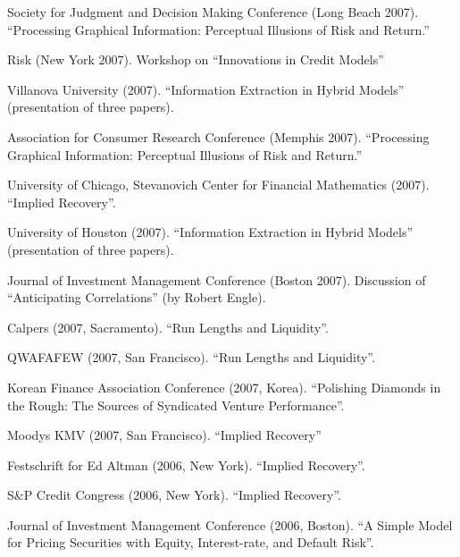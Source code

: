 \documentclass{article}
\begin{document}
\begin{etaremune}
{\item Society for Judgment and Decision Making Conference (Long Beach 2007). 
``Processing Graphical Information: Perceptual Illusions of Risk and Return.''

\item Risk (New York 2007). 
Workshop on ``Innovations in Credit Models''

\item Villanova University (2007). 
``Information Extraction in Hybrid Models'' (presentation of three papers). 

\item Association for Consumer Research Conference (Memphis 2007). 
``Processing Graphical Information: Perceptual Illusions of Risk and Return.''

\item University of Chicago, Stevanovich Center for Financial Mathematics (2007).
``Implied Recovery''. 

\item University of Houston (2007). 
``Information Extraction in Hybrid Models'' (presentation of three papers). 

\item Journal of Investment Management Conference (Boston 2007). 
Discussion of ``Anticipating Correlations'' (by Robert Engle). 

\item Calpers (2007, Sacramento). 
``Run Lengths and Liquidity''.

\item QWAFAFEW (2007, San Francisco). 
``Run Lengths and Liquidity''.

\item Korean Finance Association Conference (2007, Korea). 
``Polishing Diamonds in the Rough: The Sources of Syndicated Venture Performance''. 

\item Moodys KMV (2007, San Francisco).
``Implied Recovery'' 

\item Festschrift for Ed Altman (2006, New York).
``Implied Recovery''.

\item S\&P Credit Congress (2006, New York).
``Implied Recovery''.

\item Journal of Investment Management Conference (2006, Boston). 
``A Simple Model for Pricing  Securities with
Equity, Interest-rate, and Default Risk''.

}
\end{etaremune}
\end{document}

